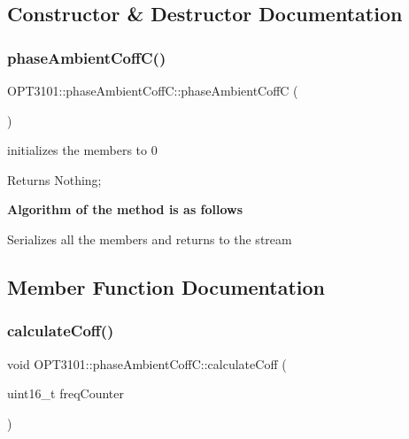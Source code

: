 \subsection{Constructor \& Destructor Documentation}
\mbox{\label{class_o_p_t3101_1_1phase_ambient_coff_c_aa32106a402df3ed93a73203634017953}} 
\subsubsection{\texorpdfstring{phase\+Ambient\+Coff\+C()}{phaseAmbientCoffC()}}
{\footnotesize\ttfamily O\+P\+T3101\+::phase\+Ambient\+Coff\+C\+::phase\+Ambient\+CoffC (\begin{DoxyParamCaption}{ }\end{DoxyParamCaption})}



initializes the members to 0 

\begin{DoxyReturn}{Returns}
Nothing; 
\end{DoxyReturn}
{\bfseries Algorithm of the method is as follows}


\begin{DoxyItemize}
\item Serializes all the members and returns to the stream 
\end{DoxyItemize}

\subsection{Member Function Documentation}
\mbox{\label{class_o_p_t3101_1_1phase_ambient_coff_c_ac8f4dfff191b0adc7be044f39500e242}} 
\subsubsection{\texorpdfstring{calculate\+Coff()}{calculateCoff()}}
{\footnotesize\ttfamily void O\+P\+T3101\+::phase\+Ambient\+Coff\+C\+::calculate\+Coff (\begin{DoxyParamCaption}\item[{uint16\+\_\+t}]{freq\+Counter }\end{DoxyParamCaption})}



